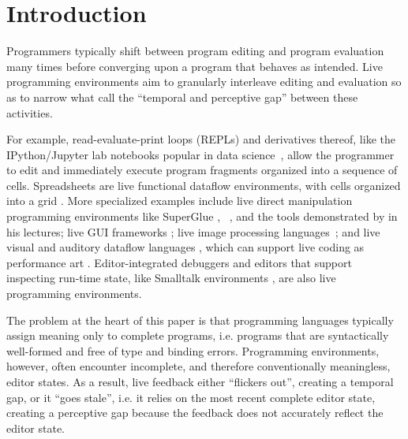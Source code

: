\newcommand{\introSec}{Introduction}
\section{\introSec} 
\label{sec:intro}


Programmers typically shift between program editing and program evaluation many times before converging upon a program that behaves as intended. 
Live programming environments aim to granularly interleave editing and evaluation so as to   
narrow what \citet{burckhardt2013s} call the ``temporal and perceptive gap'' between these activities.

For example, read-evaluate-print loops (REPLs) and derivatives thereof, like the IPython/Jupyter lab notebooks popular in data science~\cite{PER-GRA:2007}, allow the programmer to edit and immediately execute program fragments organized into a sequence of cells. 
Spreadsheets are live functional dataflow environments, with cells organized into a grid \cite{DBLP:journals/jfp/Wakeling07}. 
More specialized examples include live direct manipulation programming environments like SuperGlue
\cite{McDirmid:2007}, \sns{}~\cite{sns-pldi,sns-uist}, and the tools
demonstrated by \citet{victor2012inventing} in his lectures;
%
live GUI frameworks \cite{burckhardt2013s};
%
live image processing languages~\cite{DBLP:journals/vlc/Tanimoto90};
%
and live visual and auditory dataflow languages \cite{DBLP:conf/vl/BurnettAW98}, which can support live coding as performance art \cite{DBLP:journals/programming/ReinRLHP19}.
Editor-integrated debuggers \cite{mccauley2008debugging} and editors that support inspecting run-time state, like Smalltalk environments \cite{Goldberg:1983cn}, are also live programming environments. 

%
The problem at the heart of this paper is that
programming languages typically assign meaning only to {complete programs}, i.e. programs that are syntactically well-formed and free of type and binding errors. Programming environments, however, often encounter incomplete, and therefore conventionally meaningless, editor states. As a result, live feedback either ``flickers out'', creating a temporal gap, or it ``goes stale'', i.e. it relies on the most recent complete editor state, creating a perceptive gap because the feedback does not accurately reflect the editor state.

